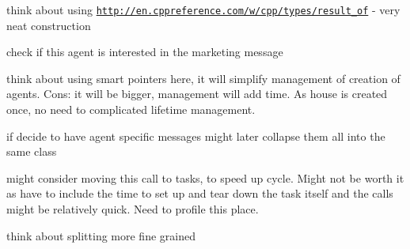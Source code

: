 
\begin{DoxyRefList}
\item[\label{_dev_stage3__DevStage3000002}%
\hypertarget{_dev_stage3__DevStage3000002}{}%
Class \hyperlink{classsolar__core_1_1_household}{solar\+\_\+core\+:\+:Household} ]think about using \href{http://en.cppreference.com/w/cpp/types/result_of}{\tt http\+://en.\+cppreference.\+com/w/cpp/types/result\+\_\+of} -\/ very neat construction 
\item[\label{_dev_stage3__DevStage3000001}%
\hypertarget{_dev_stage3__DevStage3000001}{}%
Member \hyperlink{classsolar__core_1_1_household_ac9d26af7b52f0cdc357fc5dca4b86ad9}{solar\+\_\+core\+:\+:Household\+:\+:get\+\_\+inf} (std\+::shared\+\_\+ptr$<$ Mes\+Marketing\+S\+E\+I $>$ mes\+\_\+) override]check if this agent is interested in the marketing message  
\item[\label{_dev_stage3__DevStage3000003}%
\hypertarget{_dev_stage3__DevStage3000003}{}%
Member \hyperlink{classsolar__core_1_1_household_a41d61dc3bab971cb19170341b77d9df8}{solar\+\_\+core\+:\+:Household\+:\+:params} ]think about using smart pointers here, it will simplify management of creation of agents. Cons\+: it will be bigger, management will add time. As house is created once, no need to complicated lifetime management.  
\item[\label{_dev_stage3__DevStage3000004}%
\hypertarget{_dev_stage3__DevStage3000004}{}%
Class \hyperlink{classsolar__core_1_1_mes_state_base_h_h}{solar\+\_\+core\+:\+:Mes\+State\+Base\+H\+H} ]if decide to have agent specific messages might later collapse them all into the same class 
\item[\label{_dev_stage3__DevStage3000005}%
\hypertarget{_dev_stage3__DevStage3000005}{}%
Member \hyperlink{classsolar__core_1_1_w_a08283dbea7c7f3fe8b7f094a96f73a78}{solar\+\_\+core\+:\+:W\+:\+:life\+\_\+hhs} ()]might consider moving this call to tasks, to speed up cycle. Might not be worth it as have to include the time to set up and tear down the task itself and the calls might be relatively quick. Need to profile this place.  
\item[\label{_dev_stage3__DevStage3000006}%
\hypertarget{_dev_stage3__DevStage3000006}{}%
Member \hyperlink{classsolar__core_1_1_w_ab6349cbc751747a05618dad4ebb1b726}{solar\+\_\+core\+:\+:W\+:\+:sems} ]think about splitting more fine grained 
\end{DoxyRefList}